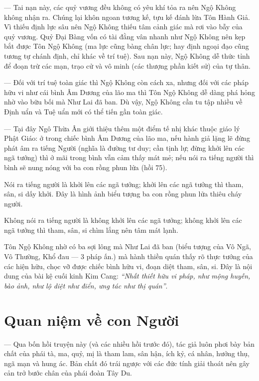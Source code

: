 — Tai nạn này, các quỷ vương đều không có yêu khí tỏa ra nên Ngộ Không không nhận ra. Chúng lại khôn ngoan tương kế, tựu kế đánh lừa Tôn Hành Giả. Vì thiếu định lực sâu nên Ngộ Không thiếu tâm cảnh giác mà rơi vào bẫy của quỷ vương. Quỷ Đại Bàng vốn có tài đằng vân nhanh như Ngộ Không nên kẹp bắt được Tôn Ngộ Không (ma lực cũng bàng chân lực; hay định ngoại đạo cũng tương tự chánh định, chỉ khác về trí tuệ). Sau nạn này, Ngộ Không dễ thức tỉnh để đoạn trừ các mạn, trạo cử và vô minh (các thượng phần kiết sử) của tự thân.

— Đối với trí tuệ toàn giác thì Ngộ Không còn cách xa, nhưng đối với các pháp hữu vi như cái bình Âm Dương của lão ma thì Tôn Ngộ Không dễ dàng phá hỏng nhờ vào bữu bối mà Như Lai đã ban. Dù vậy, Ngộ Không cần tu tập nhiều về Định uẩn và Tuệ uẩn mới có thể tiến gần toàn giác.

— Tại đây Ngô Thừa Ân giới thiệu thêm một điểm tế nhị khác thuộc giáo lý Phật Giáo: ở trong chiếc bình Âm Dương của lão ma, nếu hành giả lặng lẽ đừng phát âm ra tiếng Người (nghĩa là đường tư duy; cần tịnh lự; đừng khởi lên các ngã tướng) thì ở mãi trong bình vẫn cảm thấy mát mẻ; nếu nói ra tiếng người thì bình sẽ nung nóng với ba con rồng phun lửa (hồi 75).

Nói ra tiếng người là khởi lên các ngã tưởng; khởi lên các ngã tưởng thì tham, sân, si dấy khởi. Đây là hình ảnh biểu tượng ba con rồng phun lửa thiêu cháy người.

Không nói ra tiếng người là không khởi lên các ngã tưởng; không khởi lên các ngã tưởng thì tham, sân, si chìm lắng nên tâm mát lạnh.

Tôn Ngộ Không nhờ có ba sợi lông mà Như Lai đã ban (biểu tượng của Vô Ngã, Vô Thường, Khổ đau — 3 pháp ấn.) mà hành thiền quán thấy rõ thực tướng của các hiện hữu, chọc vỡ được chiếc bình hữu vi, đoạn diệt tham, sân, si. Đây là nội dung của bài kệ cuối kinh Kim Cang: \emph{``Nhất thiết hữu vi pháp, như mộng huyễn, bào ảnh, như lộ diệt như điển, ưng tác như thị quán''}.

\section{Quan niệm về con Người} %
\label{sec:74_75_con_nguoi}

— Qua bốn hồi truyện này (và các nhiều hồi trước đó), tác giả luôn phơi bày bản chất của phái tà, ma, quỷ, mị là tham lam, sân hận, ích kỷ, cá nhân, hưởng thụ, ngã mạn và hung ác. Bản chất đó trái ngược với các đức tính giải thoát nên gây cản trở bước chân của phái đoàn Tây Du.

